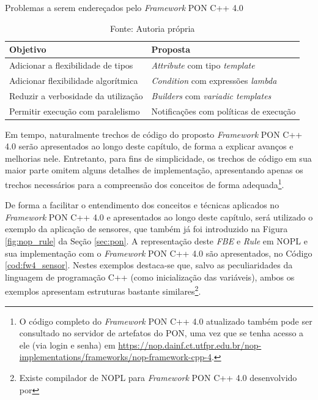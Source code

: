 \begin{table}[!htb]
\centering
\caption{Problemas a serem endereçados pelo \textit{Framework} PON C++ 4.0}
\smallskip
\begin{tabularx}{\textwidth}{|l|X|}\hline
    Objetivo & Proposta   \\\hline\hline
    Adicionar a flexibilidade de tipos & \textit{Attribute} com tipo \textit{template} \\ \hline
    Adicionar flexibilidade algorítmica & \textit{Condition} com expressões \textit{lambda} \\ \hline
    Reduzir a verbosidade da utilização & \textit{Builders} com \textit{variadic templates} \\ \hline
    Permitir execução com paralelismo & Notificações com políticas de execução \\ \hline
\end{tabularx}
\caption*{Fonte: Autoria própria}
\label{tab:obj_fw4}
\end{table}

Em tempo, naturalmente trechos de código do proposto \textit{Framework} PON C++
4.0 serão apresentados ao longo deste capítulo, de forma a explicar avanços e
melhorias nele. Entretanto, para fins de simplicidade, os trechos de código em
sua maior parte omitem alguns detalhes de implementação, apresentando apenas os
trechos necessários para a compreensão dos conceitos de forma
adequada\footnote{O código completo do \textit{Framework} PON C++ 4.0 atualizado
também pode ser consultado no servidor de artefatos do PON, uma vez que se tenha
acesso a ele (via login e senha) em
\url{https://nop.dainf.ct.utfpr.edu.br/nop-implementations/frameworks/nop-framework-cpp-4}.}.

De forma a facilitar o entendimento dos conceitos e técnicas aplicados no
\textit{Framework} PON C++ 4.0 e apresentados ao longo deste capítulo, será
utilizado o exemplo da aplicação de sensores, que também já foi introduzido na
Figura \ref{fig:nop_rule} da Seção \ref{sec:pon}. A representação deste
\textit{FBE} e \textit{Rule} em NOPL e sua implementação com o
\textit{Framework} PON C++ 4.0 são apresentados, no Código \ref{cod:fw4_sensor}.
Nestes exemplos destaca-se que,
salvo as peculiaridades da linguagem de programação C++ (como inicialização das
variáveis), ambos os exemplos apresentam estruturas bastante
similares\footnote{Existe compilador de NOPL para \textit{Framework} PON C++
4.0 desenvolvido por }.


